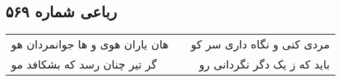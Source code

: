 \begin{center}
\section*{رباعی شماره ۵۶۹}
\label{sec:sh569}
\begin{longtable}{l p{0.5cm} r}
هان یاران هوی و ها جوانمردان هو
&&
مردی کنی و نگاه داری سر کو
\\
گر تیر چنان رسد که بشکافد مو
&&
باید که ز یک دگر نگردانی رو
\\
\end{longtable}
\end{center}
